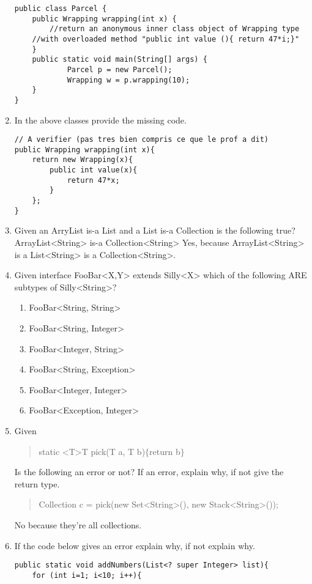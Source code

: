 \documentclass{article}
\begin{document}
\begin{enumerate}
\begin{lstlisting}
public class Parcel {
  	public Wrapping wrapping(int x) {
    	//return an anonymous inner class object of Wrapping type
   	//with overloaded method "public int value (){ return 47*i;}"
  	}
  	public static void main(String[] args) {
    		Parcel p = new Parcel();
    		Wrapping w = p.wrapping(10);
  	}
}
\end{lstlisting}
	\item In the above classes provide the missing code.
\begin{lstlisting}
// A verifier (pas tres bien compris ce que le prof a dit)
public Wrapping wrapping(int x){
	return new Wrapping(x){
		public int value(x){
			return 47*x;
		}
	};
}
\end{lstlisting}
	\item Given an ArryList is-a List and a List is-a Collection is the following true? ArrayList<String> is-a Collection<String>\newline\newline
	Yes, because ArrayList<String> is a List<String> is a Collection<String>.
	\item Given interface FooBar<X,Y> extends Silly<X> which of the following ARE subtypes of Silly<String>?
	\begin{enumerate}
		\item FooBar<String, String>
		\item FooBar<String, Integer>
		\item FooBar<Integer, String>
		\item FooBar<String, Exception>
		\item FooBar<Integer, Integer>
		\item FooBar<Exception, Integer>
	\end{enumerate}
	\item Given
	\begin{quote}
		static \textless T\textgreater  T pick(T a, T b)$\{$return b$\}$
	\end{quote}
	Is the following an error or not? If an error, explain why, if not give the return type.
	\begin{quote}
		Collection c = pick(new Set\textless String\textgreater (), new Stack\textless String\textgreater());
	\end{quote}
	No because they're all collections.
	\newpage
	\item If the code below gives an error explain why, if not explain why.
\begin{lstlisting}
public static void addNumbers(List<? super Integer> list){
	for (int i=1; i<10; i++){

\end{lstlisting}
\end{enumerate}
\end{document}
